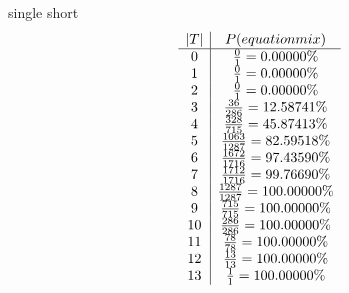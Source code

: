 single
short
\[
\begin{array}{c | c}
|T| & P (equation mix) \\\hline
 0 & \frac{0}{1} = 0.00000\%\\
 1 & \frac{0}{1} = 0.00000\%\\
 2 & \frac{0}{1} = 0.00000\%\\
 3 & \frac{36}{286} = 12.58741\%\\
 4 & \frac{328}{715} = 45.87413\%\\
 5 & \frac{1063}{1287} = 82.59518\%\\
 6 & \frac{1672}{1716} = 97.43590\%\\
 7 & \frac{1712}{1716} = 99.76690\%\\
 8 & \frac{1287}{1287} = 100.00000\%\\
 9 & \frac{715}{715} = 100.00000\%\\
10 & \frac{286}{286} = 100.00000\%\\
11 & \frac{78}{78} = 100.00000\%\\
12 & \frac{13}{13} = 100.00000\%\\
13 & \frac{1}{1} = 100.00000\%\\
\end{array}
\]
